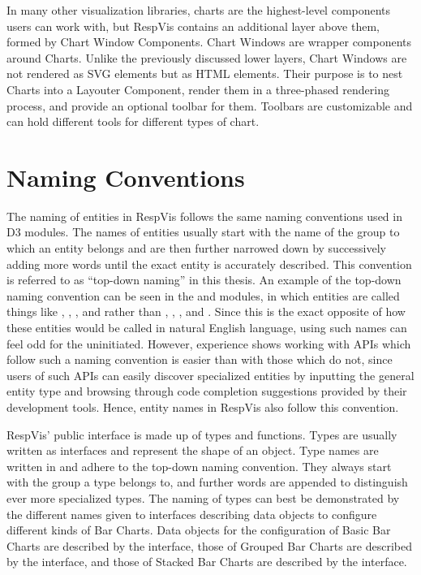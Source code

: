 In many other visualization libraries, charts are the highest-level
components users can work with, but RespVis contains an additional
layer above them, formed by Chart Window Components. Chart Windows are
wrapper components around Charts. Unlike the previously discussed
lower layers, Chart Windows are not rendered as SVG elements but as
HTML  elements. Their purpose is to nest Charts into a
Layouter Component, render them in a three-phased rendering process,
and provide an optional toolbar for them. Toolbars are customizable
and can hold different tools for different types of chart.








\section{Naming Conventions}
\label{sec:NamingConventions}

The naming of entities in RespVis follows the same naming conventions
used in D3 modules. The names of entities usually start with the name
of the group to which an entity belongs and are then further narrowed
down by successively adding more words until the exact entity is
accurately described. This convention is referred to as
\enquote{top-down naming} in this thesis. An example of the top-down
naming convention can be seen in the 
\parencite{D3Scale} and  \parencite{D3Axis} modules, in
which entities are called things like ,
, , and  rather
than , , , and
. Since this is the exact opposite of how these
entities would be called in natural English language, using such names
can feel odd for the uninitiated. However, experience shows working
with APIs which follow such a naming convention is easier than with
those which do not, since users of such APIs can easily discover
specialized entities by inputting the general entity type and browsing
through code completion suggestions provided by their development
tools. Hence, entity names in RespVis also follow this convention.

RespVis' public interface is made up of types and functions. Types
are usually written as interfaces and represent the shape of an
object. Type names are written in 
\parencite{PascalCase} and adhere to the top-down naming
convention. They always start with the group a type belongs to, and
further words are appended to distinguish ever more specialized
types. The naming of types can best be demonstrated by the different
names given to interfaces describing data objects to configure
different kinds of Bar Charts. Data objects for the configuration of
Basic Bar Charts are described by the  interface, those
of Grouped Bar Charts are described by the 
interface, and those of Stacked Bar Charts are described by the
 interface.

